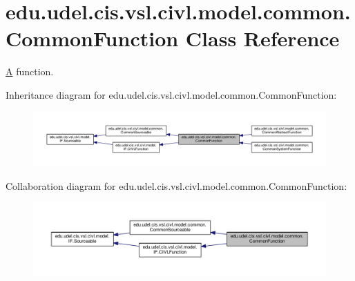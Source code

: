 \hypertarget{classedu_1_1udel_1_1cis_1_1vsl_1_1civl_1_1model_1_1common_1_1CommonFunction}{}\section{edu.\+udel.\+cis.\+vsl.\+civl.\+model.\+common.\+Common\+Function Class Reference}
\label{classedu_1_1udel_1_1cis_1_1vsl_1_1civl_1_1model_1_1common_1_1CommonFunction}


\hyperlink{structA}{A} function.  




Inheritance diagram for edu.\+udel.\+cis.\+vsl.\+civl.\+model.\+common.\+Common\+Function\+:
\nopagebreak
\begin{figure}[H]
\begin{center}
\leavevmode
\includegraphics[width=350pt]{classedu_1_1udel_1_1cis_1_1vsl_1_1civl_1_1model_1_1common_1_1CommonFunction__inherit__graph}
\end{center}
\end{figure}


Collaboration diagram for edu.\+udel.\+cis.\+vsl.\+civl.\+model.\+common.\+Common\+Function\+:
\nopagebreak
\begin{figure}[H]
\begin{center}
\leavevmode
\includegraphics[width=350pt]{classedu_1_1udel_1_1cis_1_1vsl_1_1civl_1_1model_1_1common_1_1CommonFunction__coll__graph}
\end{center}
\end{figure}
